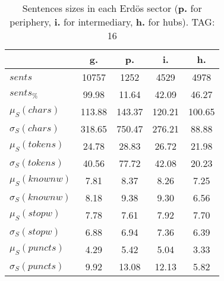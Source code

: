 \begin{table}[h!]
\begin{center}
\begin{tabular}{| l || c | c | c | c |}\hline
 & {\bf g.} & {\bf p.} & {\bf i.} & {\bf h.} \\\hline\hline
$sents$ & 10757  & 1252  & 4529  & 4978 \\
$sents_{\%}$ & 99.98  & 11.64  & 42.09  & 46.27 \\\hline
$\mu_S(chars)$ & 113.88  & 143.37  & 120.21  & 100.65 \\
$\sigma_S(chars)$ & 318.65  & 750.47  & 276.21  & 88.88 \\\hline
$\mu_S(tokens)$ & 24.78  & 28.83  & 26.72  & 21.98 \\
$\sigma_S(tokens)$ & 40.56  & 77.72  & 42.08  & 20.23 \\\hline
$\mu_S(knownw)$ & 7.81  & 8.37  & 8.26  & 7.25 \\
$\sigma_S(knownw)$ & 8.18  & 9.38  & 9.30  & 6.56 \\\hline
$\mu_S(stopw)$ & 7.78  & 7.61  & 7.92  & 7.70 \\
$\sigma_S(stopw)$ & 6.88  & 6.94  & 7.36  & 6.39 \\\hline
$\mu_S(puncts)$ & 4.29  & 5.42  & 5.04  & 3.33 \\
$\sigma_S(puncts)$ & 9.92  & 13.08  & 12.13  & 5.82 \\\hline
\end{tabular}
\caption{Sentences sizes in each Erd\"os sector ({{\bf p.}} for periphery, {{\bf i.}} for intermediary, {{\bf h.}} for hubs). TAG: 16}
\end{center}
\end{table}